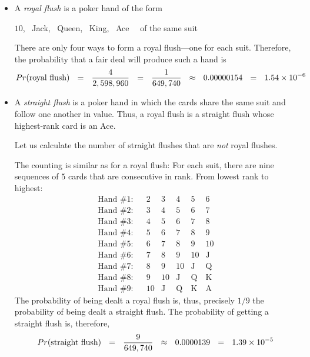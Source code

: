 \medskip

 
\begin{itemize}
\item
A {\it royal flush} is a poker hand of the form

\hspace*{.25in}$10$, \ {\sc Jack}, \ {\sc Queen}, \ {\sc King}, \ {\sc Ace} \ \ of the same suit

\noindent
There are only four ways to form a royal flush---one for each suit.  Therefore, the probability that
a fair deal will produce such a hand is
\[ 
Pr(\mbox{royal flush}) \ \ = \ \
\frac{4}{2,598,960} \ \ = \ \ {1 \over {649,740}} \ \ \approx \ \ 0.00000154 \ \ = \ \ 1.54 \times 10^{-6} \]

\item
A {\it straight flush} is a poker hand in which the cards share the same suit and follow one 
another in value.  Thus, a royal flush is a straight flush whose highest-rank card is an {\sc Ace}.

Let us calculate the number of straight flushes that are {\em not} royal flushes.

The counting is similar as for a royal flush:  For each suit, there are nine sequences of $5$ cards
that are consecutive in rank.  From lowest rank to highest:
\[ \begin{array}{llccccc}
\mbox{Hand \#1}: & &
2 & 3 & 4 & 5 & 6 \\
\mbox{Hand \#2}: & &
3 & 4 & 5 & 6 & 7 \\
\mbox{Hand \#3}: & &
4 & 5 & 6 & 7 & 8 \\
\mbox{Hand \#4}: & &
5 & 6 & 7 & 8 & 9 \\
\mbox{Hand \#5}: & &
6 & 7 & 8 & 9 & 10 \\
\mbox{Hand \#6}: & &
7 & 8 & 9 & 10 &  \mbox{J} \\
\mbox{Hand \#7}: & &
8 & 9 & 10 &  \mbox{J} &   \mbox{Q} \\
\mbox{Hand \#8}: & &
9 & 10 &  \mbox{J} & \mbox{Q} &  \mbox{K}  \\
\mbox{Hand \#9}: & &
10 &  \mbox{J}
     & \mbox{Q}
     & \mbox{K}
     & \mbox{A}
\end{array} \]
The probability of being dealt a royal flush is, thus, precisely $1/9$ the probability of being dealt a
straight flush.  The probability of getting a straight flush is, therefore,
\[  Pr(\mbox{straight flush}) \ \ = \ \
{9 \over {649,740}} \ \ \approx \ \ 0.0000139  \ \ = \ \ 1.39 \times 10^{-5} \]


\end{itemize}
